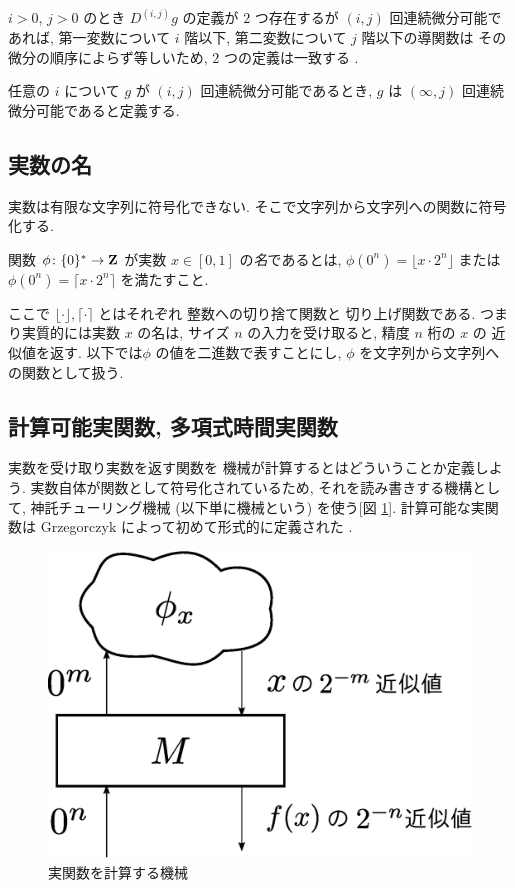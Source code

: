 $i > 0$, $j > 0$ のとき $D^{(i,j)} g$ の定義が $2$ つ存在するが
$(i, j)$ 回連続微分可能であれば,
第一変数について $i$ 階以下, 第二変数について $j$ 階以下の導関数は
その微分の順序によらず等しいため, $2$ つの定義は一致する \cite{takagi1968analysis}.

任意の $i$ について $g$ が $(i, j)$ 回連続微分可能であるとき,
$g$ は $(\infty, j)$ 回連続微分可能であると定義する.

\subsection{実数の名}
 実数は有限な文字列に符号化できない. 
 そこで文字列から文字列への関数に符号化する.
 \begin{definition}[実数の名]
  関数 $\phi \colon \{0\}^* \to \mathbf Z $ が実数 $x \in [0,1]$ の\emph{名}であるとは,
  $\phi(0^n) = \lfloor x \cdot 2^n \rfloor$ または
  $\phi(0^n) = \lceil x \cdot 2^n \rceil$ を満たすこと.
 \end{definition}
ここで $\lfloor \cdot \rfloor, \lceil \cdot \rceil$ とはそれぞれ
整数への切り捨て関数と
切り上げ関数である.
つまり実質的には実数 $x$ の名は, 
サイズ $n$ の入力を受け取ると, 精度 $n$ 桁の $x$ の
近似値を返す.
以下では$\phi$ の値を二進数で表すことにし, 
$\phi$ を文字列から文字列への関数として扱う. 



\subsection{計算可能実関数, 多項式時間実関数}

実数を受け取り実数を返す関数を
機械が計算するとはどういうことか定義しよう. 
実数自体が関数として符号化されているため, 
それを読み書きする機構として, 
神託チューリング機械 (以下単に機械という) を使う[図 \ref{fig:model-of-function}].
計算可能な実関数は Grzegorczyk によって初めて形式的に定義された
\cite{grzegorczyk1955computable}.

 \begin{figure}
  \begin{center}
   \includegraphics[height=0.15\textheight]{image/model-of-function.eps}
  \end{center}
  \caption{実関数を計算する機械}
  \label{fig:model-of-function}
 \end{figure}

